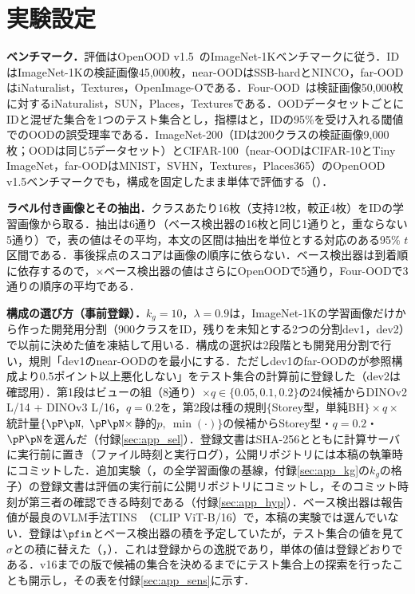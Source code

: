 

\section{実験設定}
\label{sec:exp}
\textbf{ベンチマーク．}評価はOpenOOD v1.5~\cite{zhang2023openood}のImageNet-1Kベンチマークに従う．IDはImageNet-1Kの検証画像45,000枚，near-OODはSSB-hardとNINCO，far-OODはiNaturalist，Textures，OpenImage-Oである．Four-OOD~\cite{huang2021mos}は検証画像50,000枚に対するiNaturalist，SUN，Places，Texturesである．OODデータセットごとにIDと混ぜた集合を1つのテスト集合とし，指標は\AUC{}と，IDの95\%を受け入れる閾値でのOODの誤受理率\FPR{}である．ImageNet-200（IDは200クラスの検証画像9,000枚；OODは同じ5データセット）とCIFAR-100（near-OODはCIFAR-10とTiny ImageNet，far-OODはMNIST，SVHN，Textures，Places365）のOpenOOD v1.5ベンチマークでも，構成を固定したまま単体で評価する（）．

\textbf{ラベル付き画像とその抽出．}クラスあたり16枚（支持12枚，較正4枚）をIDの学習画像から取る．抽出は6通り（ベース検出器の16枚と同じ1通りと，重ならない5通り）で，表の値はその平均，本文の区間は抽出を単位とする対応のある95\% $t$区間である．事後採点のスコアは画像の順序に依らない．ベース検出器は到着順に依存するので，$\times$ベース検出器の値はさらにOpenOODで5通り，Four-OODで3通りの順序の平均である．

\textbf{構成の選び方（事前登録）．}$k_g{=}10$，$\lambda{=}0.9$は，ImageNet-1Kの学習画像だけから作った開発用分割（900クラスをID，残りを未知とする2つの分割dev1，dev2）で以前に決めた値を凍結して用いる．構成の選択は2段階とも開発用分割で行い，規則「dev1のnear-OODの\FPR{}を最小にする．ただしdev1のfar-OODの\FPR{}が参照構成より0.5ポイント以上悪化しない」をテスト集合の計算前に登録した（dev2は確認用）．第1段はビューの組（8通り）$\times q\in\{0.05,0.1,0.2\}$の24候補からDINOv2 L/14 + DINOv3 L/16，$q{=}0.2$を，第2段は種の規則$\{$Storey型，単純BH$\}\times q\times$統計量$\{\pP\pN,\ \pP\pN\times$静的$p,\ \min(\cdot)\}$の\NSelqNCandidates{}候補からStorey型・$q{=}0.2$・$\pP\pN$を選んだ（付録\ref{sec:app_sel}）．登録文書はSHA-256とともに計算サーバに実行前に置き（ファイル時刻と実行ログ），公開リポジトリには本稿の執筆時にコミットした．追加実験（，の全学習画像の基線，付録\ref{sec:app_kg}の$k_g$の格子）の登録文書は評価の実行前に公開リポジトリにコミットし，そのコミット時刻が第三者の確認できる時刻である（付録\ref{sec:app_hyp}）．ベース検出器は報告値が最良のVLM手法TINS~\cite{yang2026tins}（CLIP ViT-B/16）で，本稿の実験では選んでいない．登録は$\pfin$とベース検出器の積を予定していたが，テスト集合の値を見て$\sigma$との積に替えた（，）．これは登録からの逸脱であり，単体の値は登録どおりである．v16までの版で候補の集合を決めるまでにテスト集合上の探索を行ったことも開示し，その表を付録\ref{sec:app_sens}に示す．

